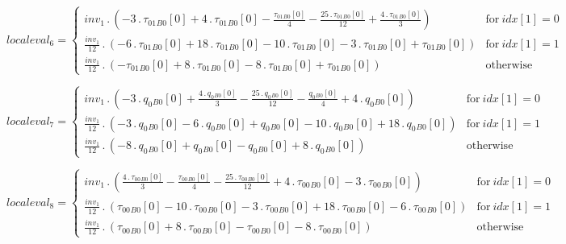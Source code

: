 \documentclass{article}
\begin{document}
\begin{dmath}localeval_{6} = \begin{cases} inv_1 \,.\, \left(- 3 \,.\, {\tau_{01}{_{B0}}}[{0}] + 4 \,.\, {\tau_{01}{_{B0}}}[{0}] - \frac{{\tau_{01}{_{B0}}}[{0}]}{4} - \frac{25 \,.\, {\tau_{01}{_{B0}}}[{0}]}{12} + \frac{4 \,.\, 
{\tau_{01}{_{B0}}}[{0}]}{3}\right) & \text{for}\: {idx}[{1}] = 0 \\\frac{inv_1}{12} \,.\, \left(- 6 \,.\, {\tau_{01}{_{B0}}}[{0}] + 18 \,.\, {\tau_{01}{_{B0}}}[{0}] - 10 \,.\, {\tau_{01}{_{B0}}}[{0}] - 3 \,.\, {\tau_{01}{_{B0}}}[{0}] + 
{\tau_{01}{_{B0}}}[{0}]\right) & \text{for}\: {idx}[{1}] = 1 \\\frac{inv_1}{12} \,.\, \left(- {\tau_{01}{_{B0}}}[{0}] + 8 \,.\, {\tau_{01}{_{B0}}}[{0}] - 8 \,.\, {\tau_{01}{_{B0}}}[{0}] + {\tau_{01}{_{B0}}}[{0}]\right) & \text{otherwise} 
\end{cases}\end{dmath}

\begin{dmath}localeval_{7} = \begin{cases} inv_1 \,.\, \left(- 3 \,.\, {q_{0}{_{B0}}}[{0}] + \frac{4 \,.\, {q_{0}{_{B0}}}[{0}]}{3} - \frac{25 \,.\, {q_{0}{_{B0}}}[{0}]}{12} - \frac{{q_{0}{_{B0}}}[{0}]}{4} + 4 \,.\, {q_{0}{_{B0}}}[{0}]\right) & 
\text{for}\: {idx}[{1}] = 0 \\\frac{inv_1}{12} \,.\, \left(- 3 \,.\, {q_{0}{_{B0}}}[{0}] - 6 \,.\, {q_{0}{_{B0}}}[{0}] + {q_{0}{_{B0}}}[{0}] - 10 \,.\, {q_{0}{_{B0}}}[{0}] + 18 \,.\, {q_{0}{_{B0}}}[{0}]\right) & \text{for}\: {idx}[{1}] = 1 
\\\frac{inv_1}{12} \,.\, \left(- 8 \,.\, {q_{0}{_{B0}}}[{0}] + {q_{0}{_{B0}}}[{0}] - {q_{0}{_{B0}}}[{0}] + 8 \,.\, {q_{0}{_{B0}}}[{0}]\right) & \text{otherwise} \end{cases}\end{dmath}

\begin{dmath}localeval_{8} = \begin{cases} inv_1 \,.\, \left(\frac{4 \,.\, {\tau_{00}{_{B0}}}[{0}]}{3} - \frac{{\tau_{00}{_{B0}}}[{0}]}{4} - \frac{25 \,.\, {\tau_{00}{_{B0}}}[{0}]}{12} + 4 \,.\, {\tau_{00}{_{B0}}}[{0}] - 3 \,.\, 
{\tau_{00}{_{B0}}}[{0}]\right) & \text{for}\: {idx}[{1}] = 0 \\\frac{inv_1}{12} \,.\, \left({\tau_{00}{_{B0}}}[{0}] - 10 \,.\, {\tau_{00}{_{B0}}}[{0}] - 3 \,.\, {\tau_{00}{_{B0}}}[{0}] + 18 \,.\, {\tau_{00}{_{B0}}}[{0}] - 6 \,.\, 
{\tau_{00}{_{B0}}}[{0}]\right) & \text{for}\: {idx}[{1}] = 1 \\\frac{inv_1}{12} \,.\, \left({\tau_{00}{_{B0}}}[{0}] + 8 \,.\, {\tau_{00}{_{B0}}}[{0}] - {\tau_{00}{_{B0}}}[{0}] - 8 \,.\, {\tau_{00}{_{B0}}}[{0}]\right) & \text{otherwise} 
\end{cases}\end{dmath}
\end{document}
